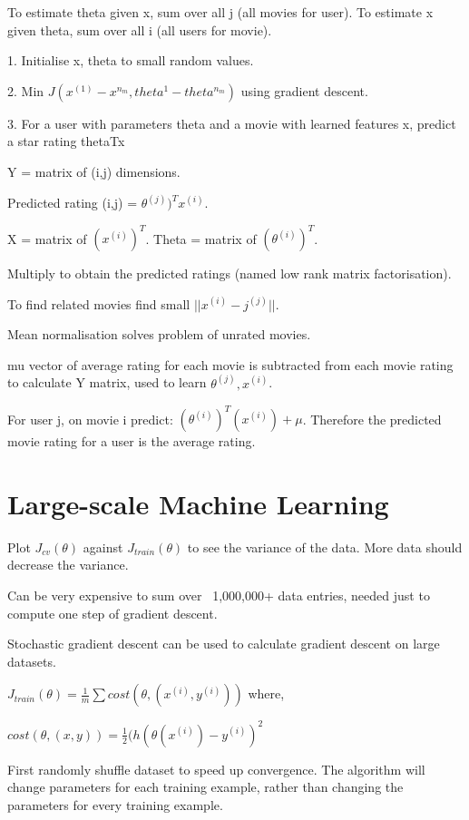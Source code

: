 \documentclass[12pt] {article}
\begin{document}
{  To estimate theta given x, sum over all j (all movies for user). To estimate
  x given theta, sum over all i (all users for movie).

  1. Initialise x, theta to small random values.

  2. Min $J(x^{(1)}-x^{n_m},theta^{1}-theta^{n_m})$ using gradient descent.

  3. For a user with parameters theta and a movie with learned features x, 
  predict a star rating thetaTx

  Y = matrix of (i,j) dimensions.

  Predicted rating (i,j) = $\theta^{(j)})^T x^{(i)}$.

  X = matrix of $(x^{(i)})^T$. Theta = matrix of $(\theta^{(i)})^T$. 

  Multiply to obtain the predicted ratings (named low rank matrix
  factorisation). 

  To find related movies find small $||x^{(i)}-j^{(j)}||$.

  Mean normalisation solves problem of unrated movies. 

  mu vector of average rating for each movie is subtracted from each movie
  rating to calculate Y matrix, used to learn $\theta^{(j)}, x^{(i)}$.
  
  For user j, on movie i predict: $(\theta^{(i)})^T(x^{(i)}) + \mu$. Therefore the predicted
  movie rating for a user is the average rating. 

  \newpage

\section{Large-scale Machine Learning}

  Plot $J_{cv}(\theta)$ against $J_{train}(\theta)$ to see the variance of the 
  data. More data should decrease the variance.

  Can be very expensive to sum over ~1,000,000+ data entries, needed just to 
  compute one step of gradient descent.

  Stochastic gradient descent can be used to calculate gradient descent on
  large datasets. 

  $J_{train}(\theta) = \frac{1}{m} \sum cost(\theta, (x^{(i)}, y^{(i)}))$ where,

  $cost(\theta, (x,y)) = \frac{1}{2} (h(\theta(x^{(i)}) - y^{(i)})^2$

  First randomly shuffle dataset to speed up convergence. The algorithm will 
  change parameters for each training example, rather than changing the
  parameters for every training example. 

}
\end{document}
